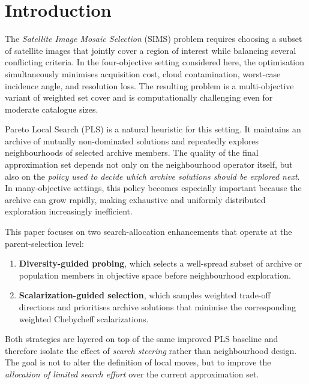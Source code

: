 \documentclass[11pt,a4paper]{article}
\begin{document}
\section{Introduction}\label{sec:intro}

The \emph{Satellite Image Mosaic Selection} (SIMS) problem requires
choosing a subset of satellite images that jointly cover a region of
interest while balancing several conflicting criteria.  In the
four-objective setting considered here, the optimisation simultaneously
minimises acquisition cost, cloud contamination, worst-case incidence
angle, and resolution loss.  The resulting problem is a multi-objective
variant of weighted set cover and is computationally challenging even
for moderate catalogue sizes.

Pareto Local Search (PLS) is a natural heuristic for this setting.  It
maintains an archive of mutually non-dominated solutions and repeatedly
explores neighbourhoods of selected archive members.  The quality of the
final approximation set depends not only on the neighbourhood operator
itself, but also on the \emph{policy used to decide which archive
solutions should be explored next}.  In many-objective settings, this
policy becomes especially important because the archive can grow rapidly,
making exhaustive and uniformly distributed exploration increasingly
inefficient.

This paper focuses on two search-allocation enhancements that operate at
the parent-selection level:
\begin{enumerate}
  \item \textbf{Diversity-guided probing}, which selects a well-spread
    subset of archive or population members in objective space before
    neighbourhood exploration.
  \item \textbf{Scalarization-guided selection}, which samples weighted
    trade-off directions and prioritises archive solutions that minimise
    the corresponding weighted Chebycheff scalarizations.
\end{enumerate}

Both strategies are layered on top of the same improved PLS baseline and
therefore isolate the effect of \emph{search steering} rather than
neighbourhood design.  The goal is not to alter the definition of local
moves, but to improve the \emph{allocation of limited search effort}
over the current approximation set.
\end{document}
